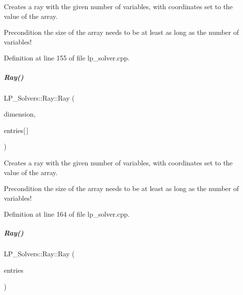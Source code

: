 Creates a ray with the given number of variables, with coordinates set to the value of the array. 

\begin{DoxyPrecond}{Precondition}
the size of the array needs to be at least as long as the number of variables! 
\end{DoxyPrecond}


Definition at line 155 of file lp\+\_\+solver.\+cpp.

\mbox{\label{group___c_l_s_solvers_aecc046b9f6a47f40ffddfc3334a47079}} 
\subparagraph{\texorpdfstring{Ray()}{Ray()}\hspace{0.1cm}{\footnotesize\ttfamily [3/5]}}
{\footnotesize\ttfamily L\+P\+\_\+\+Solvers\+::\+Ray\+::\+Ray (\begin{DoxyParamCaption}\item[{N\+V\+A\+R\+\_\+\+T\+Y\+PE}]{dimension,  }\item[{const E\+X\+P\+\_\+\+T\+Y\+PE}]{entries\mbox{[}$\,$\mbox{]} }\end{DoxyParamCaption})}



Creates a ray with the given number of variables, with coordinates set to the value of the array. 

\begin{DoxyPrecond}{Precondition}
the size of the array needs to be at least as long as the number of variables! 
\end{DoxyPrecond}


Definition at line 164 of file lp\+\_\+solver.\+cpp.

\mbox{\label{group___c_l_s_solvers_adb1e6f09dbb5081c8f34d245b1880ccc}} 
\subparagraph{\texorpdfstring{Ray()}{Ray()}\hspace{0.1cm}{\footnotesize\ttfamily [4/5]}}
{\footnotesize\ttfamily L\+P\+\_\+\+Solvers\+::\+Ray\+::\+Ray (\begin{DoxyParamCaption}\item[{const vector$<$ R\+A\+Y\+E\+N\+T\+\_\+\+T\+Y\+PE $>$ \&}]{entries }\end{DoxyParamCaption})\hspace{0.3cm}{\ttfamily [explicit]}}



